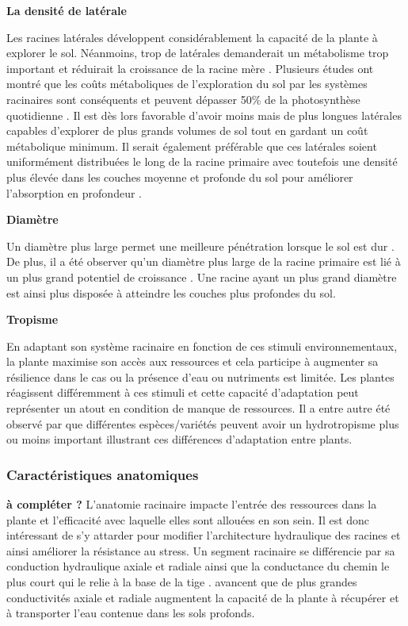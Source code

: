\noindent \textbf{La densité de latérale}

Les racines latérales développent considérablement la capacité de la plante à explorer le sol.
Néanmoins, trop de latérales demanderait un métabolisme trop important et réduirait la croissance de la racine mère \citep{lynch_root_2014}.
Plusieurs études ont montré que les coûts métaboliques de l'exploration du sol par les systèmes racinaires sont conséquents et peuvent dépasser 50\% de la photosynthèse quotidienne \citep{kafkafi_respiratory_2002}.
Il est dès lors favorable d'avoir moins mais de plus longues latérales capables d'explorer de plus grands volumes de sol tout en gardant un coût métabolique minimum.
Il serait également préférable que ces latérales soient uniformément distribuées le long de la racine primaire avec toutefois une densité plus élevée dans les couches moyenne et profonde du sol pour améliorer l'absorption en profondeur \citep{wasson_traits_2012}.
\newline

\noindent \textbf{Diamètre}

Un diamètre plus large permet une meilleure pénétration lorsque le sol est dur \citep{bengough_root_2011}.
De plus, il a été observer qu'un diamètre plus large de la racine primaire est lié à un plus grand potentiel de croissance \citep{pages_estimating_2010}.
Une racine ayant un plus grand diamètre est ainsi plus disposée à atteindre les couches plus profondes du sol.
\newline

\noindent \textbf{Tropisme}

En adaptant son système racinaire en fonction de ces stimuli environnementaux, la plante maximise son accès aux ressources et cela participe à augmenter sa résilience dans le cas ou la présence d'eau ou nutriments est limitée.
Les plantes réagissent différemment à ces stimuli et cette capacité d'adaptation peut représenter un atout en condition de manque de ressources.
Il a entre autre été observé par \cite{gul_hydrotropism_2023} que différentes espèces/variétés peuvent avoir un hydrotropisme plus ou moins important illustrant ces différences d'adaptation entre plants.

\subsubsection{Caractéristiques anatomiques}

\textbf{à compléter ?}
L'anatomie racinaire impacte l'entrée des ressources dans la plante et l'efficacité avec laquelle elles sont allouées en son sein.
Il est donc intéressant de s'y attarder pour modifier l'architecture hydraulique des racines et ainsi améliorer la résistance au stress.
Un segment racinaire se différencie par sa conduction hydraulique axiale et radiale ainsi que la conductance du chemin le plus court qui le relie à la base de la tige \citep{lobet_plant_2014}.
\citep{wasson_traits_2012} avancent que de plus grandes conductivités axiale et radiale augmentent la capacité de la plante à récupérer et à transporter l'eau contenue dans les sols profonds. 
\newline

